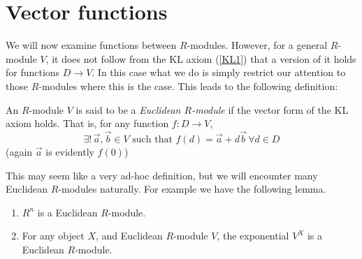 \section{Vector functions}
We will now examine functions between \( R \)-modules. However, for a general \( R \)-module \( V \), it does not follow from the KL axiom (\ref{KL1}) that a version of it holds for functions \( D\to V \). In this case what we do is simply restrict our attention to those \( R \)-modules where this is the case. This leads to the following definition:

\begin{defn}
  An \( R \)-module \( V \) is said to be a \emph{Euclidean \( R \)-module} if the vector form of the KL axiom holds. That is, for any function \( f: D\to V \),
  \begin{equation*}
    \exists! \, \vec a,\vec b\in V \text{ such that } f(d) = \vec a + d\vec b \,\forall d\in D
  \end{equation*}
  (again \( \vec a \) is evidently \( f(0) \))
\end{defn}

This may seem like a very ad-hoc definition, but we will encounter many Euclidean \( R \)-modules naturally. For example we have the following lemma.

\begin{lemma}
  \leavevmode
  \begin{enumerate}
    \item \( R^n \) is a Euclidean \( R \)-module.
    \item For any object \( X \), and Euclidean \( R \)-module \( V \), the exponential \( V^X \) is a Euclidean \( R \)-module. 
  \end{enumerate}
  \label{lm:Emod}
\end{lemma}

